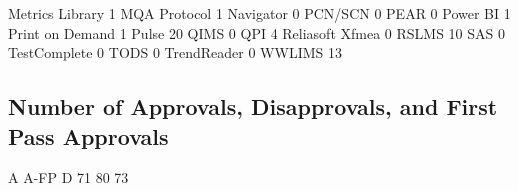 \documentclass{article}
\begin{document}
\begin{Schunk}
\begin{Soutput}
                         Metrics Library 
                                       1 
                            MQA Protocol 
                                       1 
                               Navigator 
                                       0 
                                 PCN/SCN 
                                       0 
                                    PEAR 
                                       0 
                                Power BI 
                                       1 
                         Print on Demand 
                                       1 
                                   Pulse 
                                      20 
                                    QIMS 
                                       0 
                                     QPI 
                                       4 
                         Reliasoft Xfmea 
                                       0 
                                   RSLMS 
                                      10 
                                     SAS 
                                       0 
                            TestComplete 
                                       0 
                                    TODS 
                                       0 
                             TrendReader 
                                       0 
                                  WWLIMS 
                                      13 
\end{Soutput}
\end{Schunk}

\subsection{Number of Approvals, Disapprovals, and First Pass Approvals}

\begin{Schunk}
\begin{Soutput}
   A A-FP    D 
  71   80   73 
\end{Soutput}
\end{Schunk}
\end{document}

